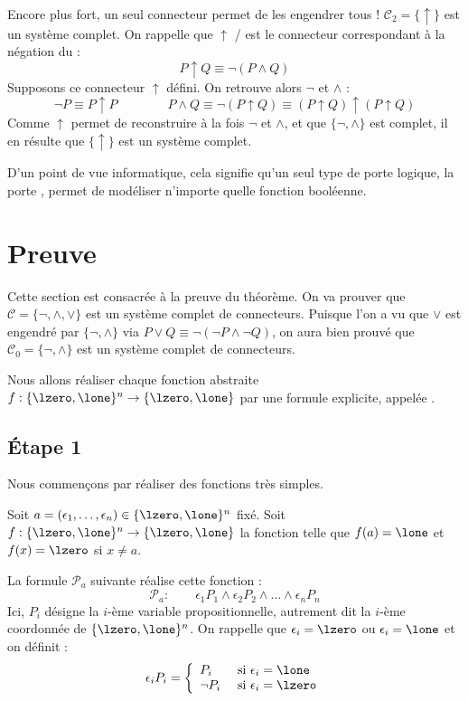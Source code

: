 \documentclass[11pt,class=report,crop=false]{standalone}
\begin{document}
Encore plus fort, un seul connecteur permet de les engendrer tous !
$\mathcal{C}_2 = \{ \uparrow\}$ est un système complet. On rappelle que
$\uparrow$ /  est le connecteur correspondant à la négation du \tand{} :
\[
P \uparrow Q \equiv  \lnot(P \land Q)
\]
Supposons ce connecteur $\uparrow$ défini. On retrouve alors $\lnot$ et $\land$ :
\[
\lnot P \equiv P \uparrow P
\qquad
\qquad
P \land Q \equiv \lnot(P \uparrow Q) \equiv (P \uparrow Q) \uparrow (P \uparrow Q)
\]
Comme $\uparrow$ permet de reconstruire à la fois $\lnot$ et $\land$, et que $\{ \lnot, \land \}$ est complet, il en résulte que $\{ \uparrow\}$ est un système complet.


D'un point de vue informatique, cela signifie qu'un seul type de porte logique, la porte , permet de modéliser n'importe quelle fonction booléenne.


\section{Preuve}

Cette section est consacrée à la preuve du théorème.
On va prouver que $\mathcal{C} = \{\lnot, \land, \lor\}$ est un système complet de connecteurs.
Puisque l'on a vu que $\lor$ est engendré par $\{ \lnot, \land \}$ via $P \lor Q \equiv \lnot(\lnot P \land \lnot Q)$, on aura bien prouvé que $\mathcal{C}_0 = \{\lnot, \land\}$ est un système complet de connecteurs.

Nous allons réaliser chaque fonction abstraite $f : \{\lzero,\lone\}^n \to \{\lzero,\lone\}$ par une formule explicite, appelée .

\subsection{Étape 1}

Nous commençons par réaliser des fonctions très simples.

Soit $a = (\epsilon_1,\ldots,\epsilon_n) \in \{\lzero,\lone\}^n$ fixé.
Soit $f : \{\lzero,\lone\}^n \to \{\lzero,\lone\}$ la fonction telle que $f(a) = \lone$ et
$f(x) = \lzero$ si $x \neq a$.

La formule $\mathcal{P}_a$ suivante réalise cette fonction :
\[
\mathcal{P}_a : \qquad
\epsilon_1 P_1 \land \epsilon_2 P_2 \land \ldots \land \epsilon_n P_n
\]
Ici, $P_i$ désigne la $i$-ème variable propositionnelle, autrement dit la $i$-ème coordonnée de $\{\lzero,\lone\}^n$.
On rappelle que $\epsilon_i = \lzero$ ou $\epsilon_i=\lone$ et on définit : 
\[
\epsilon_i P_i = \left\{ 
\begin{array}{ll}
	P_i & \text{ si } \epsilon_i = \lone \\
	\lnot P_i & \text{ si } \epsilon_i = \lzero \\	
\end{array}	
\right.
\]
\end{document}
